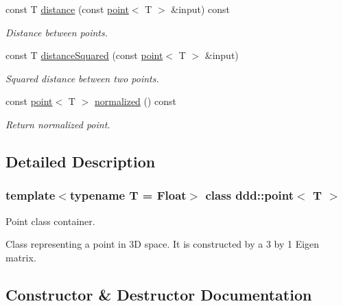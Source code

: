 \begin{DoxyCompactItemize}
const T \hyperlink{classddd_1_1point_a59d8714cc178090ddf75b0c9dbd832c9}{distance} (const \hyperlink{classddd_1_1point}{point}$<$ T $>$ \&input) const
\begin{DoxyCompactList}\small\item\em Distance between points. \end{DoxyCompactList}\item 
const T \hyperlink{classddd_1_1point_a4b6793fd154fc9ad4dd93a4927d4ee13}{distance\+Squared} (const \hyperlink{classddd_1_1point}{point}$<$ T $>$ \&input)
\begin{DoxyCompactList}\small\item\em Squared distance between two points. \end{DoxyCompactList}\item 
\mbox{\label{classddd_1_1point_ac17331c629f79d5abd4b48d807967470}} 
const \hyperlink{classddd_1_1point}{point}$<$ T $>$ \hyperlink{classddd_1_1point_ac17331c629f79d5abd4b48d807967470}{normalized} () const
\begin{DoxyCompactList}\small\item\em Return normalized point. \end{DoxyCompactList}\end{DoxyCompactItemize}


\subsection{Detailed Description}
\subsubsection*{template$<$typename T = Float$>$\newline
class ddd\+::point$<$ T $>$}

Point class container. 

Class representing a point in 3D space. It is constructed by a 3 by 1 Eigen matrix. 

\subsection{Constructor \& Destructor Documentation}
\mbox{\label{classddd_1_1point_a0146118d518509e9e7cdf4fb6733eb48}} 
